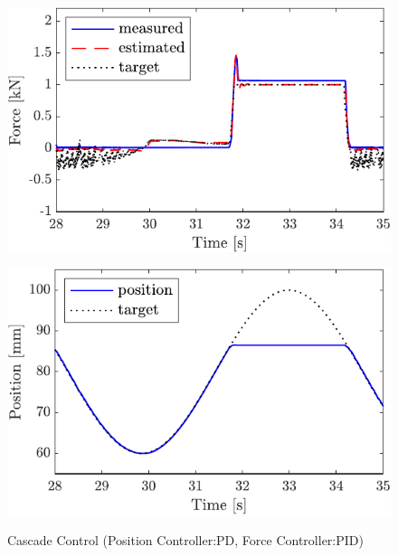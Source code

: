 \begin{figure}[t]
    \begin{minipage}{\minipageratio\hsize}
    \centering
        \includegraphics[keepaspectratio, scale = \minifigscale]{contents/IntegrationControl/figure/SECASQ/crop-FBcsqtch_PID_Notrq_posPIDadjust_force.pdf}
        \label{fig5:crop-FBcsqtch_PID_Notrq_posPIDadjust_force}
    \end{minipage}
    \begin{minipage}{\minipageratio\hsize}
    \centering
        \includegraphics[keepaspectratio, scale = \minifigscale]{contents/IntegrationControl/figure/SECASQ/crop-FBcsqtch_PID_Notrq_posPIDadjust_pos.pdf}
        \label{fig5:crop-FBcsqtch_PID_Notrq_posPIDadjust_pos}
    \end{minipage}
    \caption{Cascade Control (Position Controller:PD, Force Controller:PID)}  
    \label{fig5:crop-FBcsqtch_PID_Notrq_posPIDadjust}
\end{figure}

